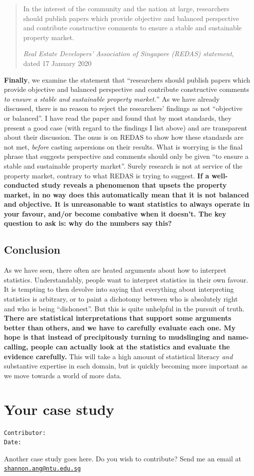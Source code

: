 \documentclass[openany]{book}
\begin{document}
\begin{quote}
In the interest of the community and the nation at large, researchers
should publish papers which provide objective and balanced perspective
and contribute constructive comments to ensure a stable and sustainable
property market.

\emph{Real Estate Developers' Association of Singapore (REDAS)
statement}, dated 17 January 2020
\end{quote}

\textbf{Finally}, we examine the statement that ``researchers should
publish papers which provide objective and balanced perspective and
contribute constructive comments \emph{to ensure a stable and
sustainable property market.}'' As we have already discussed, there is
no reason to reject the researchers' findings as not ``objective or
balanced''. I have read the paper and found that by most standards, they
present a good case (with regard to the findings I list above) and are
transparent about their discussion. The onus is on REDAS to show how
these standards are not met, \emph{before} casting aspersions on their
results. What is worrying is the final phrase that suggests perspective
and comments should only be given ``to ensure a stable and sustainable
property market''. Surely research is not at service of the property
market, contrary to what REDAS is trying to suggest. \textbf{If a
well-conducted study reveals a phenomenon that upsets the property
market, in no way does this automatically mean that it is not balanced
and objective. It is unreasonable to want statistics to always operate
in your favour, and/or become combative when it doesn't. The key
question to ask is: why do the numbers say this?}

\section{Conclusion}\label{conclusion-4}

As we have seen, there often are heated arguments about how to interpret
statistics. Understandably, people want to interpret statistics in their
own favour. It is tempting to then devolve into saying that everything
about interpreting statistics is arbitrary, or to paint a dichotomy
between who is absolutely right and who is being ``dishonest''. But this
is quite unhelpful in the pursuit of truth. \textbf{There are
statistical interpretations that support some arguments better than
others, and we have to carefully evaluate each one. My hope is that
instead of precipitously turning to mudslinging and name-calling, people
can actually look at the statistics and evaluate the evidence
carefully.} This will take a high amount of statistical literacy
\emph{and} substantive expertise in each domain, but is quickly becoming
more important as we move towards a world of more data.

\chapter{Your case study}\label{case3}

\begin{verbatim}
Contributor: 
Date: 
\end{verbatim}

Another case study goes here. Do you wish to contribute? Send me an
email at
\href{mailto:shannon.ang@ntu.edu.sg}{\nolinkurl{shannon.ang@ntu.edu.sg}}


\end{document}
